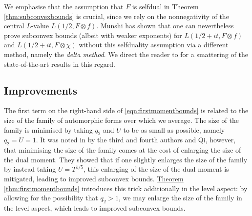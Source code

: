 \documentclass[11pt,a4paper]{amsart}
\numberwithin{equation}{section}
\theoremstyle{remark}
\theoremstyle{definition}
\begin{document}
We emphasise that the assumption that $F$ is selfdual in \hyperref[thm:subconvexbounds]{Theorem \ref*{thm:subconvexbounds}} is crucial, since we rely on the nonnegativity of the central $L$-value $L(1/2,F \otimes f)$. Munshi \cite{Mun15a,Mun15b,Mun22} has shown that one can nevertheless prove subconvex bounds (albeit with weaker exponents) for $L(1/2 + it,F \otimes f)$ and $L(1/2 + it, F \otimes \chi)$ without this selfduality assumption via a different method, namely the \emph{delta method}. We direct the reader to \cite{Agg21,Hua24,HX23,Lin21} for a smattering of the state-of-the-art results in this regard.


\subsection{Improvements}

The first term on the right-hand side of \eqref{eqn:firstmomentbounds} is related to the size of the family of automorphic forms over which we average. The size of the family is minimised by taking $q_2$ and $U$ to be as small as possible, namely $q_2 = U = 1$. It was noted in \cite{LNQ23} by the third and fourth authors and Qi, however, that minimising the size of the family comes at the cost of enlarging the size of the dual moment. They showed that if one slightly enlarges the size of the family by instead taking $U = T^{1/5}$, this enlarging of the size of the dual moment is mitigated, leading to improved subconvex bounds. \hyperref[thm:firstmomentbounds]{Theorem \ref*{thm:firstmomentbounds}} introduces this trick additionally in the level aspect: by allowing for the possibility that $q_2 > 1$, we may enlarge the size of the family in the level aspect, which leads to improved subconvex bounds.
\end{document}

